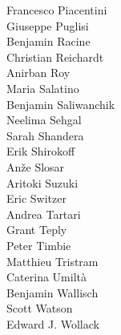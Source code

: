 \documentclass[PICOReport.tex]{subfiles}
\begin{document}
{\begin{multicols}{4}
Francesco Piacentini            \\
Giuseppe Puglisi                \\
Benjamin Racine                 \\
Christian Reichardt             \\
Anirban Roy                     \\
Maria Salatino                  \\
Benjamin Saliwanchik            \\
Neelima Sehgal                  \\
Sarah Shandera                  \\
Erik Shirokoff                  \\
An\v{z}e Slosar                 \\
Aritoki Suzuki                  \\
Eric Switzer                    \\
Andrea Tartari                  \\
Grant Teply                     \\
Peter Timbie                    \\
Matthieu Tristram               \\
Caterina Umilt\`{a}             \\
Benjamin Wallisch               \\
Scott Watson                    \\
Edward J. Wollack               
\end{multicols}

}
\end{document}
